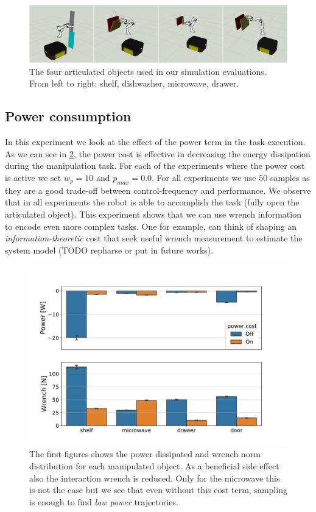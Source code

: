 \begin{figure}[t]
\centering
  \includegraphics[width=\columnwidth]{framework_manipulation/figures/mosaics/articulated_objects_sim.pdf}
  \caption{The four articulated objects used in our simulation evaluations. From left to right: shelf, dishwasher, microwave, drawer.} \label{fig:object_manipulation}
\end{figure}

\subsection{Power consumption}
In this experiment we look at the effect of the power term in the task execution. As we can see in \fig \ref{fig:power_cost_comparison}, the power cost is effective in decreasing the energy dissipation during the manipulation task. For each of the experiments where the power cost is active we set $w_p=10$ and $p_{max} = 0.0$. For all experiments we use $50$ samples as they are a good trade-off between control-frequency and performance. We observe that in all experiments the robot is able to accomplish the task (fully open the articulated object). This experiment shows that we can use wrench information to encode even more complex tasks. One for example, can think of shaping an \textit{information-theoretic} cost that seek useful wrench measurement to estimate the system model (TODO repharse or put in future works). 

\begin{figure}[t]
\centering
  \includegraphics[width=\columnwidth]{figures/methods_comparison/power_cost.pdf}
  \caption{The first figures shows the power dissipated and wrench norm distribution for each manipulated object. As a beneficial side effect also the interaction wrench is reduced. Only for the microwave this is not the case but we see that even without this cost term, sampling is enough to find \textit{low power} trajectories.} \label{fig:power_cost_comparison}
\end{figure}


